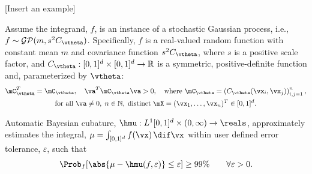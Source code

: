 [Insert an example]


\iffalse 









Assume the integrand, $f$, is an instance of a stochastic Gaussian process, i.e., $f \sim \mathcal{GP}(m,s^2 C_{\vtheta})$.  Specifically, $f$ is a real-valued random function with constant mean $m$ and covariance function $s^2C_{\vtheta}$, where $s$ is a positive scale factor, and $C_{\vtheta}: [0,1]^d \times [0,1]^d \to \mathbb{R} $ is a symmetric, positive-definite function and, parameterized by $\vtheta$:
\begin{multline} \label{FJH:eq:CondPosDef}
\mC_{\vtheta}^T = \mC_{\vtheta},  \quad {\va^T} \mC_{\vtheta} {\va} > 0, \quad \text{where }  \mC_{\vtheta} = \left(  C_{\vtheta}({\vx}_i,{\vx}_j)  \right)_{i,j=1}^n, \\
\text{for all } {\va} \ne 0, \;
n\in \mathbb{N}, \; \text{distinct} \; \mX = ({\vx}_1, \ldots, {\vx}_n)^T \in [0,1]^d.
\end{multline}

Automatic Bayesian cubature, $\hmu: L^1[0,1]^d \times (0,\infty) \to \reals$, approximately estimates the integral, $\mu = \int_{[0,1]^d} f(\vx) \, \dif \vx$ within user defined error tolerance, $\varepsilon$, 
 such that 
\[
{\Prob_f  [ }\abs{ \mu - \hmu(f,\varepsilon)} \le \varepsilon 
{ ] \ge 99\%} \qquad \forall \varepsilon > 0.
\]

